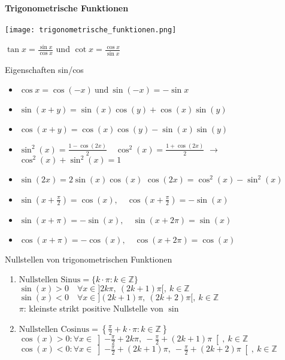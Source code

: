 \paragraph{Trigonometrische Funktionen}
\texttt{[image: trigonometrische\_funktionen.png]}
\begin{remark}
    $\tan x = \frac{\sin x}{\cos x}$ und $\cot x = \frac{\cos x}{\sin x}$ 
\end{remark}


\begin{corollary}{Eigenschaften sin/cos} \small
    \begin{itemize}
        \item $\cos x = \cos(-x) ~\text{und}~ \sin(-x) = -\sin x$
        \item $\sin(x + y) = \sin(x)\cos(y) + \cos(x)\sin(y)$
        \item $\cos(x + y) = \cos(x)\cos(y) - \sin(x)\sin(y)$
        \item $\sin^2(x) = \frac{1 - \cos(2x)}{2} \quad \cos^2(x) = \frac{1 + \cos(2x)}{2}$ $\rightarrow$ $\cos^2(x) + \sin^2(x) = 1$
        \item $\sin(2x) = 2 \sin(x)\cos(x)$ \hspace{4mm} $\cos(2x) = \cos^2(x) - \sin^2(x)$
         \item $\sin(x + \frac{\pi}{2}) = \cos(x), \quad \cos(x + \frac{\pi}{2}) = -\sin(x)$
         \item $\sin(x+\pi) = -\sin (x), \quad \sin(x + 2\pi) = \sin(x)$
         \item $\cos(x+\pi) = -\cos (x), \quad \cos(x + 2\pi) = \cos(x)$
     \end{itemize}
 \end{corollary}

 \begin{KR}{Nullstellen von trigonometrischen Funktionen}
    \begin{enumerate}
         \item $\text{Nullstellen Sinus} = \{k\cdot \pi : k\in \mathbb{Z}\}$ \\
        $\sin(x) > 0 \quad \forall x \in ]2k\pi, ~(2k+1)\pi[, ~ k\in \mathbb{Z}$\\[2pt]
        $\sin(x) < 0 \quad \forall x \in ](2k + 1)\pi, ~(2k+2)\pi[, ~ k\in \mathbb{Z}$\\
        $\pi$: kleinste strikt positive Nullstelle von $\sin$
        \item $\text{Nullstellen Cosinus} = \left\{\frac{\pi}{2}+k\cdot \pi : k\in \mathbb{Z}\right\}$\\
        $\cos(x) > 0:\forall x \in \left]-\frac{\pi}{2} +2k\pi, ~-\frac{\pi}{2} +(2k+1)\pi\right[, ~ k\in \mathbb{Z}$\\[2pt]
        $\cos(x) < 0:\forall x \in \left]-\frac{\pi}{2} + (2k + 1)\pi, ~-\frac{\pi}{2} +(2k+2)\pi\right[, ~ k\in \mathbb{Z}$
    \end{enumerate}
\end{KR}
 
